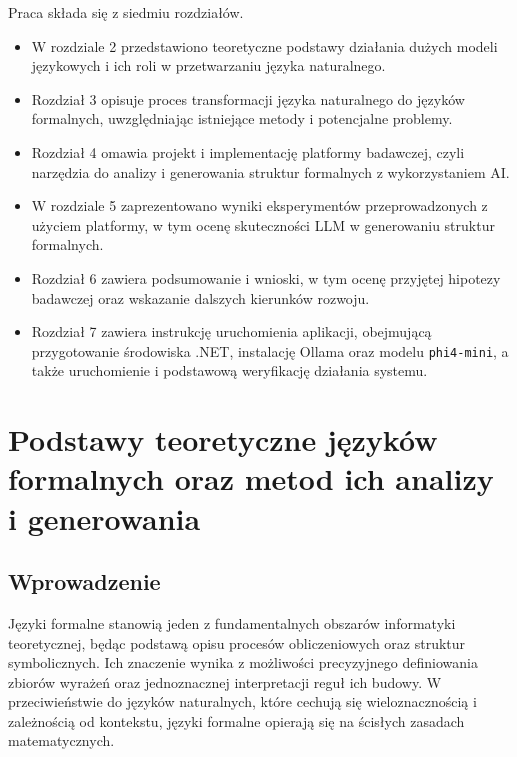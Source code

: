 \documentclass[12pt]{article}
\begin{document}
Praca składa się z siedmiu rozdziałów.

\begin{itemize}
    \item W rozdziale 2 przedstawiono teoretyczne podstawy działania dużych modeli językowych i ich roli w przetwarzaniu języka naturalnego.
    
    \item Rozdział 3 opisuje proces transformacji języka naturalnego do języków formalnych, uwzględniając istniejące metody i potencjalne problemy.
    
    \item Rozdział 4 omawia projekt i implementację platformy badawczej, czyli narzędzia do analizy i generowania struktur formalnych z wykorzystaniem AI.
    
    \item W rozdziale 5 zaprezentowano wyniki eksperymentów przeprowadzonych z użyciem platformy, w tym ocenę skuteczności LLM w generowaniu struktur formalnych.
    
    \item Rozdział 6 zawiera podsumowanie i wnioski, w tym ocenę przyjętej hipotezy badawczej oraz wskazanie dalszych kierunków rozwoju.
    \item Rozdział 7 zawiera instrukcję uruchomienia aplikacji, obejmującą przygotowanie środowiska .NET, instalację Ollama oraz modelu \texttt{phi4-mini}, a także uruchomienie i podstawową weryfikację działania systemu.
\end{itemize}

\newpage

\section{Podstawy teoretyczne języków formalnych oraz metod ich analizy i generowania}

\subsection{Wprowadzenie}

Języki formalne stanowią jeden z fundamentalnych obszarów informatyki teoretycznej, będąc podstawą opisu procesów obliczeniowych oraz struktur symbolicznych. Ich znaczenie wynika z możliwości precyzyjnego definiowania zbiorów wyrażeń oraz jednoznacznej interpretacji reguł ich budowy. W przeciwieństwie do języków naturalnych, które cechują się wieloznacznością i zależnością od kontekstu, języki formalne opierają się na ścisłych zasadach matematycznych.
\end{document}
